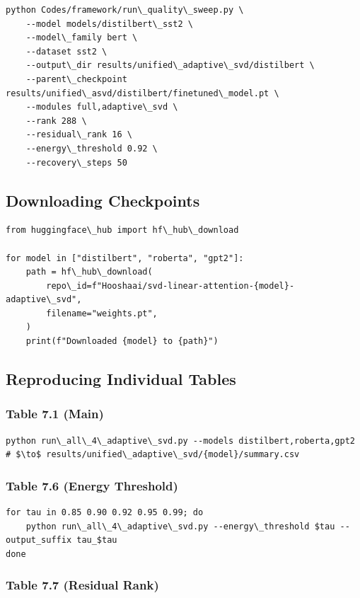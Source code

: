 \begin{lstlisting}
python Codes/framework/run\_quality\_sweep.py \
    --model models/distilbert\_sst2 \
    --model\_family bert \
    --dataset sst2 \
    --output\_dir results/unified\_adaptive\_svd/distilbert \
    --parent\_checkpoint results/unified\_asvd/distilbert/finetuned\_model.pt \
    --modules full,adaptive\_svd \
    --rank 288 \
    --residual\_rank 16 \
    --energy\_threshold 0.92 \
    --recovery\_steps 50
\end{lstlisting}

\subsection{Downloading Checkpoints}

\begin{lstlisting}
from huggingface\_hub import hf\_hub\_download

for model in ["distilbert", "roberta", "gpt2"]:
    path = hf\_hub\_download(
        repo\_id=f"Hooshaai/svd-linear-attention-{model}-adaptive\_svd",
        filename="weights.pt",
    )
    print(f"Downloaded {model} to {path}")
\end{lstlisting}

\subsection{Reproducing Individual Tables}

\subsubsection{Table 7.1 (Main)}

\begin{lstlisting}
python run\_all\_4\_adaptive\_svd.py --models distilbert,roberta,gpt2
# $\to$ results/unified\_adaptive\_svd/{model}/summary.csv
\end{lstlisting}

\subsubsection{Table 7.6 (Energy Threshold)}

\begin{lstlisting}
for tau in 0.85 0.90 0.92 0.95 0.99; do
    python run\_all\_4\_adaptive\_svd.py --energy\_threshold $tau --output_suffix tau_$tau
done
\end{lstlisting}

\subsubsection{Table 7.7 (Residual Rank)}

